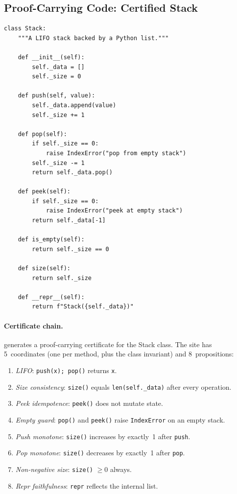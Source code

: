 \subsection{Proof-Carrying Code: Certified Stack}%
\label{sec:app-stack}

\begin{lstlisting}[style=jugeo-python,caption={Stack implementation.},label={lst:stack}]
class Stack:
    """A LIFO stack backed by a Python list."""

    def __init__(self):
        self._data = []
        self._size = 0

    def push(self, value):
        self._data.append(value)
        self._size += 1

    def pop(self):
        if self._size == 0:
            raise IndexError("pop from empty stack")
        self._size -= 1
        return self._data.pop()

    def peek(self):
        if self._size == 0:
            raise IndexError("peek at empty stack")
        return self._data[-1]

    def is_empty(self):
        return self._size == 0

    def size(self):
        return self._size

    def __repr__(self):
        return f"Stack({self._data})"
\end{lstlisting}

\paragraph{Certificate chain.}
\JuGeo{} generates a proof-carrying certificate for the Stack class.
The site has 5~coordinates (one per method, plus the class invariant)
and 8~propositions:
\begin{enumerate}[nosep,label=(\roman*)]
  \item \emph{LIFO}: \texttt{push(x); pop()} returns \texttt{x}.
  \item \emph{Size consistency}: \texttt{size()} equals
    \texttt{len(self.\_data)} after every operation.
  \item \emph{Peek idempotence}: \texttt{peek()} does not mutate state.
  \item \emph{Empty guard}: \texttt{pop()} and \texttt{peek()} raise
    \texttt{IndexError} on an empty stack.
  \item \emph{Push monotone}: \texttt{size()} increases by exactly~1
    after \texttt{push}.
  \item \emph{Pop monotone}: \texttt{size()} decreases by exactly~1
    after \texttt{pop}.
  \item \emph{Non-negative size}: \texttt{size()} $\geq 0$ always.
  \item \emph{Repr faithfulness}: \texttt{repr} reflects the
    internal list.
\end{enumerate}

